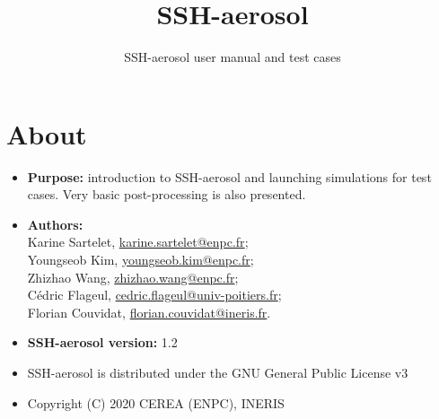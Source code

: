 \documentclass[a4paper,11pt]{article}
\title{SSH-aerosol}
\date{}
\author{SSH-aerosol user manual and test cases}
\begin{document}
\maketitle

\section*{About}

\begin{itemize}
\item[] {\bf Purpose:} introduction to SSH-aerosol and launching simulations
  for test cases. Very basic post-processing is also
  presented. 
\item[] {\bf Authors:} \\Karine Sartelet, \url{karine.sartelet@enpc.fr};\\
  Youngseob Kim, \url{youngseob.kim@enpc.fr};\\ Zhizhao Wang,
  \url{zhizhao.wang@enpc.fr};\\ C\'edric Flageul,
  \url{cedric.flageul@univ-poitiers.fr}; \\Florian Couvidat, \url{florian.couvidat@ineris.fr}.
\item[] {\bf SSH-aerosol version:} 1.2
\item[] SSH-aerosol is distributed under the GNU General Public License v3
\item[] Copyright (C) 2020 CEREA (ENPC), INERIS
\end{itemize}

\tableofcontents

\newpage
\end{document}
